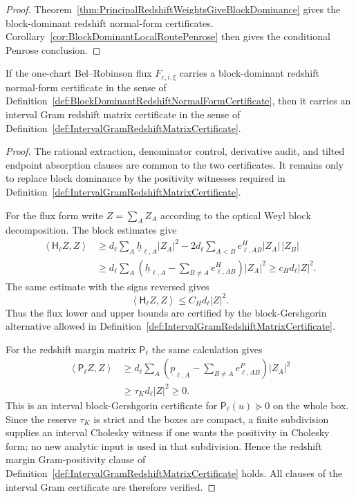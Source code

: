 \begin{proof}
Theorem~\ref{thm:PrincipalRedshiftWeightsGiveBlockDominance} gives the
block-dominant redshift normal-form certificates.  Corollary~\ref{cor:BlockDominantLocalRoutePenrose}
then gives the conditional Penrose conclusion.
\end{proof}

\begin{theorem}\label{thm:BlockDominanceIntervalGramCertificate}
If the one-chart Bel--Robinson flux $F_{\varepsilon,i,\xi}$ carries a
block-dominant redshift normal-form certificate in the sense of
Definition~\ref{def:BlockDominantRedshiftNormalFormCertificate}, then it carries
an interval Gram redshift matrix certificate in the sense of
Definition~\ref{def:IntervalGramRedshiftMatrixCertificate}.
\end{theorem}

\begin{proof}
The rational extraction, denominator control, derivative audit, and tilted
endpoint absorption clauses are common to the two certificates.  It remains only
to replace block dominance by the positivity witnesses required in
Definition~\ref{def:IntervalGramRedshiftMatrixCertificate}.

For the flux form write $Z=\sum_A Z_A$ according to the optical Weyl block
decomposition.  The block estimates give
\[
\begin{split}
    \left\langle \mathsf H_\ell Z,Z\right\rangle
    &\ge
    d_\ell\sum_A\underline h_{\ell,A}|Z_A|^2
    -
    2d_\ell\sum_{A<B}e^H_{\ell,AB}|Z_A|\,|Z_B|  \\
    &\ge
    d_\ell\sum_A
    \left(
        \underline h_{\ell,A}-\sum_{B\ne A}e^H_{\ell,AB}
    \right)|Z_A|^2
    \ge
    c_Hd_\ell |Z|^2 .
\end{split}
\]
The same estimate with the signs reversed gives
\[
    \left\langle \mathsf H_\ell Z,Z\right\rangle
    \le
    C_Hd_\ell |Z|^2.
\]
Thus the flux lower and upper bounds are certified by the block-Gershgorin
alternative allowed in Definition~\ref{def:IntervalGramRedshiftMatrixCertificate}.

For the redshift margin matrix $\mathsf P_\ell$ the same calculation gives
\[
\begin{split}
    \left\langle \mathsf P_\ell Z,Z\right\rangle
    &\ge
    d_\ell\sum_A
    \left(
        \underline p_{\ell,A}-\sum_{B\ne A}e^P_{\ell,AB}
    \right)|Z_A|^2  \\
    &\ge
    \tau_K d_\ell |Z|^2
    \ge 0 .
\end{split}
\]
This is an interval block-Gershgorin certificate for
$\mathsf P_\ell(u)\succeq0$ on the whole box.  Since the reserve $\tau_K$ is
strict and the boxes are compact, a finite subdivision supplies an interval
Cholesky witness if one wants the positivity in Cholesky form; no new analytic
input is used in that subdivision.  Hence the redshift margin Gram-positivity
clause of Definition~\ref{def:IntervalGramRedshiftMatrixCertificate} holds.
All clauses of the interval Gram certificate are therefore verified.
\end{proof}

